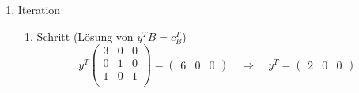 \documentclass[a4paper]{scrartcl}
\begin{document}
\begin{enumerate}[label=\bfseries\arabic*.]
\begin{enumerate}
\begin{enumerate}[1.]
                    \item Iteration
                        \begin{enumerate}[1.]
                            \item Schritt (Lösung von $y^TB = c_B^T$)
                                \begin{equation}
                                    y^T
                                    \begin{pmatrix}
                                        3 & 0 & 0 \\
                                        0 & 1 & 0 \\
                                        1 & 0 & 1 \\
                                    \end{pmatrix}
                                    =
                                    \begin{pmatrix}
                                        6 & 0 & 0
                                    \end{pmatrix}
                                    \quad\Rightarrow\quad
                                    y^T =
                                    \begin{pmatrix}
                                        2 & 0 & 0
                                    \end{pmatrix}
                                \end{equation}
                                

\end{enumerate}
\end{enumerate}
\end{enumerate}
\end{enumerate}
\end{document}
